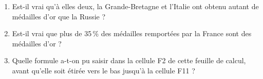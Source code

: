\begin{enumerate}
\item Est-il vrai qu'à elles deux, la Grande-Bretagne et l'Italie ont obtenu autant de médailles d'or
que la Russie ?
\item Est-il vrai que plus de 35\,\% des médailles remportées par la France sont des médailles d'or ?
\item Quelle formule a-t-on pu saisir dans la cellule F2 de cette feuille de calcul, avant qu'elle soit
étirée vers le bas jusqu'à la cellule F11 ?

\end{enumerate}

\bigskip


